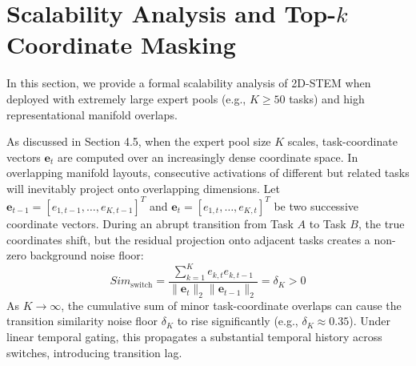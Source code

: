 \section{Scalability Analysis and Top-$k$ Coordinate Masking}
\label{sec:scalability_analysis}

In this section, we provide a formal scalability analysis of 2D-STEM when deployed with extremely large expert pools (e.g., $K \ge 50$ tasks) and high representational manifold overlaps. 

As discussed in Section 4.5, when the expert pool size $K$ scales, task-coordinate vectors $\mathbf{e}_t$ are computed over an increasingly dense coordinate space. In overlapping manifold layouts, consecutive activations of different but related tasks will inevitably project onto overlapping dimensions. Let $\mathbf{e}_{t-1} = [e_{1, t-1}, \dots, e_{K, t-1}]^T$ and $\mathbf{e}_t = [e_{1, t}, \dots, e_{K, t}]^T$ be two successive coordinate vectors. During an abrupt transition from Task $A$ to Task $B$, the true coordinates shift, but the residual projection onto adjacent tasks creates a non-zero background noise floor:
\begin{equation}
    Sim_{\text{switch}} = \frac{\sum_{k=1}^K e_{k, t} e_{k, t-1}}{\|\mathbf{e}_t\|_2 \|\mathbf{e}_{t-1}\|_2} = \delta_K > 0
\end{equation}
As $K \to \infty$, the cumulative sum of minor task-coordinate overlaps can cause the transition similarity noise floor $\delta_K$ to rise significantly (e.g., $\delta_K \approx 0.35$). Under linear temporal gating, this propagates a substantial temporal history across switches, introducing transition lag.

